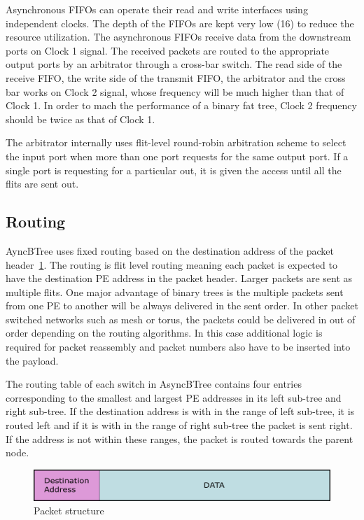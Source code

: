Asynchronous FIFOs can operate their read and write interfaces using independent clocks.
The depth of the FIFOs are kept very low (16) to reduce the resource utilization.
The asynchronous FIFOs receive data from the downstream ports on Clock 1 signal.
The received packets are routed to the appropriate output ports by an arbitrator through a cross-bar switch.
The read side of the receive FIFO, the write side of the transmit FIFO, the arbitrator and the cross bar works on Clock 2 signal, whose frequency will be much higher than that of Clock 1.
In order to mach the performance of a binary fat tree, Clock 2 frequency should be twice as that of Clock 1.

The arbitrator internally uses flit-level round-robin arbitration scheme to select the input port when more than one port requests for the same output port.
If a single port is requesting for a particular out, it is given the access until all the flits are sent out.

\subsection{Routing}
\label{sec:routing}
AyncBTree uses fixed routing based on the destination address of the packet header~\ref{fig:packet}.
The routing is flit level routing meaning each packet is expected to have the destination PE address in the packet header.
Larger packets are sent as multiple flits.
One major advantage of binary trees is the multiple packets sent from one PE to another will be always delivered in the sent order.
In other packet switched networks such as mesh or torus, the packets could be delivered in out of order depending on the routing algorithms.
In this case additional logic is required for packet reassembly and packet numbers also have to be inserted into the payload.

The routing table of each switch in AsyncBTree contains four entries corresponding to the smallest and largest PE addresses in its left sub-tree and right sub-tree.
If the destination address is with in the range of left sub-tree, it is routed left and if it is with in the range of right sub-tree the packet is sent right.
If the address is not within these ranges, the packet is routed towards the parent node.

\begin{figure}[t]
\centering
   \includegraphics[width=\columnwidth]{Figures/pckt_structure.pdf}
   \caption{Packet structure}
   \label{fig:packet}
\end{figure}
